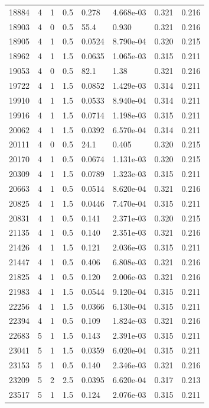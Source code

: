\documentclass[preview]{standalone}
\begin{document}
{{{\begin{tabular}{L{1.2cm}C{1.2cm} C{0.3cm}C{0.5cm} C{1.4cm}C{1.4cm} C{1.4cm}C{1.4cm}}
  18884  &     4  & 1     & 0.5 &  0.278  & 4.668e-03  & 0.321 &  0.216   \\ 
  18903  &     4  & 0     & 0.5 &  55.4  & 0.930  & 0.321 &  0.216   \\ 
  18905  &     4  & 1     & 0.5 &  0.0524  & 8.790e-04  & 0.320 &  0.215   \\ 
  18962  &     4  & 1     & 1.5 &  0.0635  & 1.065e-03  & 0.315 &  0.211   \\ 
  19053  &     4  & 0     & 0.5 &  82.1  & 1.38  & 0.321 &  0.216   \\ 
  19722  &     4  & 1     & 1.5 &  0.0852  & 1.429e-03  & 0.314 &  0.211   \\ 
  19910  &     4  & 1     & 1.5 &  0.0533  & 8.940e-04  & 0.314 &  0.211   \\ 
  19916  &     4  & 1     & 1.5 &  0.0714  & 1.198e-03  & 0.315 &  0.211   \\ 
  20062  &     4  & 1     & 1.5 &  0.0392  & 6.570e-04  & 0.314 &  0.211   \\ 
  20111  &     4  & 0     & 0.5 &  24.1  & 0.405  & 0.320 &  0.215   \\ 
  20170  &     4  & 1     & 0.5 &  0.0674  & 1.131e-03  & 0.320 &  0.215   \\ 
  20309  &     4  & 1     & 1.5 &  0.0789  & 1.323e-03  & 0.315 &  0.211   \\ 
  20663  &     4  & 1     & 0.5 &  0.0514  & 8.620e-04  & 0.321 &  0.216   \\ 
  20825  &     4  & 1     & 1.5 &  0.0446  & 7.470e-04  & 0.315 &  0.211   \\ 
  20831  &     4  & 1     & 0.5 &  0.141  & 2.371e-03  & 0.320 &  0.215   \\ 
  21135  &     4  & 1     & 0.5 &  0.140  & 2.351e-03  & 0.321 &  0.216   \\ 
  21426  &     4  & 1     & 1.5 &  0.121  & 2.036e-03  & 0.315 &  0.211   \\ 
  21447  &     4  & 1     & 0.5 &  0.406  & 6.808e-03  & 0.321 &  0.216   \\ 
  21825  &     4  & 1     & 0.5 &  0.120  & 2.006e-03  & 0.321 &  0.216   \\ 
  21983  &     4  & 1     & 1.5 &  0.0544  & 9.120e-04  & 0.315 &  0.211   \\ 
  22256  &     4  & 1     & 1.5 &  0.0366  & 6.130e-04  & 0.315 &  0.211   \\ 
  22394  &     4  & 1     & 0.5 &  0.109  & 1.824e-03  & 0.321 &  0.216   \\ 
  22683  &     5  & 1     & 1.5 &  0.143  & 2.391e-03  & 0.315 &  0.211   \\ 
  23041  &     5  & 1     & 1.5 &  0.0359  & 6.020e-04  & 0.315 &  0.211   \\ 
  23153  &     5  & 1     & 0.5 &  0.140  & 2.346e-03  & 0.321 &  0.216   \\ 
  23209  &     5  & 2     & 2.5 &  0.0395  & 6.620e-04  & 0.317 &  0.213   \\ 
  23517  &     5  & 1     & 1.5 &  0.124  & 2.076e-03  & 0.315 &  0.211   \\ 
\hline 
\end{tabular} 

}}}
\end{document}
